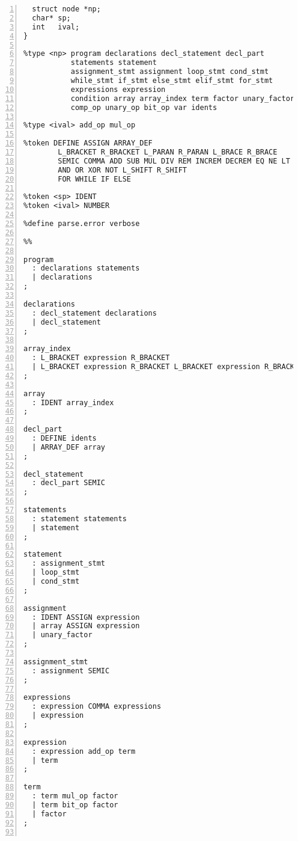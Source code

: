 \begin{Verbatim}[numbers=left, xleftmargin=10mm, numbersep=6pt, frame=single,
                    fontsize=\small, baselinestretch=0.8]
%union {
  struct node *np;
  char* sp;
  int   ival;
}

%type <np> program declarations decl_statement decl_part
           statements statement 
           assignment_stmt assignment loop_stmt cond_stmt 
           while_stmt if_stmt else_stmt elif_stmt for_stmt
           expressions expression 
           condition array array_index term factor unary_factor 
           comp_op unary_op bit_op var idents

%type <ival> add_op mul_op

%token DEFINE ASSIGN ARRAY_DEF 
        L_BRACKET R_BRACKET L_PARAN R_PARAN L_BRACE R_BRACE
        SEMIC COMMA ADD SUB MUL DIV REM INCREM DECREM EQ NE LT GT LTE GTE
        AND OR XOR NOT L_SHIFT R_SHIFT
        FOR WHILE IF ELSE

%token <sp> IDENT
%token <ival> NUMBER

%define parse.error verbose

%%

program
  : declarations statements 
  | declarations           
;

declarations
  : decl_statement declarations 
  | decl_statement             
;

array_index
  : L_BRACKET expression R_BRACKET 
  | L_BRACKET expression R_BRACKET L_BRACKET expression R_BRACKET 
;

array
  : IDENT array_index 
;

decl_part
  : DEFINE idents 
  | ARRAY_DEF array 
;

decl_statement
  : decl_part SEMIC   
;

statements
  : statement statements 
  | statement          
;

statement
  : assignment_stmt
  | loop_stmt       
  | cond_stmt     
;

assignment
  : IDENT ASSIGN expression 
  | array ASSIGN expression  
  | unary_factor 
;

assignment_stmt
  : assignment SEMIC 
;

expressions
  : expression COMMA expressions 
  | expression                   
;

expression
  : expression add_op term 
  | term                   
;

term
  : term mul_op factor
  | term bit_op factor 
  | factor             
;


\end{Verbatim}
